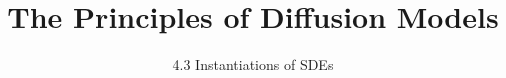 ﻿%

\graphicspath{{../images/}}
\title{The Principles of Diffusion Models}
\subtitle{4.3 Instantiations of SDEs}


\begin{frame}
    \titlepage
\end{frame}


